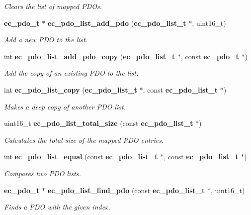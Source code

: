 \begin{DoxyCompactItemize}
\begin{DoxyCompactList}\small\item\em Clears the list of mapped P\-D\-Os. \end{DoxyCompactList}\item 
{\bf ec\-\_\-pdo\-\_\-t} $\ast$ {\bf ec\-\_\-pdo\-\_\-list\-\_\-add\-\_\-pdo} ({\bf ec\-\_\-pdo\-\_\-list\-\_\-t} $\ast$, uint16\-\_\-t)
\begin{DoxyCompactList}\small\item\em Add a new P\-D\-O to the list. \end{DoxyCompactList}\item 
int {\bf ec\-\_\-pdo\-\_\-list\-\_\-add\-\_\-pdo\-\_\-copy} ({\bf ec\-\_\-pdo\-\_\-list\-\_\-t} $\ast$, const {\bf ec\-\_\-pdo\-\_\-t} $\ast$)
\begin{DoxyCompactList}\small\item\em Add the copy of an existing P\-D\-O to the list. \end{DoxyCompactList}\item 
int {\bf ec\-\_\-pdo\-\_\-list\-\_\-copy} ({\bf ec\-\_\-pdo\-\_\-list\-\_\-t} $\ast$, const {\bf ec\-\_\-pdo\-\_\-list\-\_\-t} $\ast$)
\begin{DoxyCompactList}\small\item\em Makes a deep copy of another P\-D\-O list. \end{DoxyCompactList}\item 
uint16\-\_\-t {\bf ec\-\_\-pdo\-\_\-list\-\_\-total\-\_\-size} (const {\bf ec\-\_\-pdo\-\_\-list\-\_\-t} $\ast$)
\begin{DoxyCompactList}\small\item\em Calculates the total size of the mapped P\-D\-O entries. \end{DoxyCompactList}\item 
int {\bf ec\-\_\-pdo\-\_\-list\-\_\-equal} (const {\bf ec\-\_\-pdo\-\_\-list\-\_\-t} $\ast$, const {\bf ec\-\_\-pdo\-\_\-list\-\_\-t} $\ast$)
\begin{DoxyCompactList}\small\item\em Compares two P\-D\-O lists. \end{DoxyCompactList}\item 
{\bf ec\-\_\-pdo\-\_\-t} $\ast$ {\bf ec\-\_\-pdo\-\_\-list\-\_\-find\-\_\-pdo} (const {\bf ec\-\_\-pdo\-\_\-list\-\_\-t} $\ast$, uint16\-\_\-t)
\begin{DoxyCompactList}\small\item\em Finds a P\-D\-O with the given index. \end{DoxyCompactList}\item 

\end{DoxyCompactItemize}
